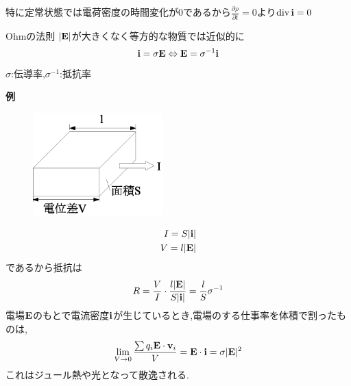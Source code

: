 \documentclass{jsarticle}
\begin{document}
特に定常状態では電荷密度の時間変化が0であるから$\frac{\partial \rho}{\partial t}=0$より${\rm div}\,{\bf i}=0$
\\
\begin{itembox}[c]{Ohmの法則}
$|{\bf E}|$が大きくなく等方的な物質では近似的に
\begin{eqnarray}
{\bf i} = \sigma {\bf E} \Leftrightarrow {\bf E} = \sigma^{-1} {\bf i}
\end{eqnarray}
$\sigma$:伝導率,$\sigma^{-1}$:抵抗率
\end{itembox}
{\bf 例} \\
\begin{figure}[htbp]
 \begin{center}
  \includegraphics[width=50mm]{7.6.eps}
 \end{center}
 \caption{}
 \label{fig:six}
\end{figure}
\begin{eqnarray*}
I = S |{\bf i}| \\
V = l |{\bf E}|
\end{eqnarray*}
であるから抵抗は
\begin{eqnarray*}
R=\frac{V}{I} \cdot \frac{ l |{\bf E}|}{S |{\bf i}|} = \frac{l}{S}\sigma^{-1}
\end{eqnarray*}
電場${\bf E}$のもとで電流密度${\bf i}$が生じているとき,電場のする仕事率を体積で割ったものは,
\begin{eqnarray*}
\lim_{V \to 0} \frac{ \sum q_i {\bf E}  \cdot {\bf v}_i}{V} = {\bf E} \cdot {\bf i} = \sigma |{\bf E}|^2
\end{eqnarray*}
これはジュール熱や光となって散逸される.
\end{document}
